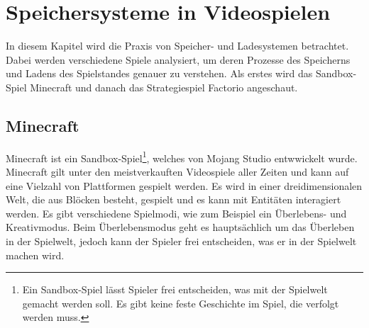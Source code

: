\chapter{Speichersysteme in Videospielen}\label{ch:videospiele}
In diesem Kapitel wird die Praxis von Speicher- und Ladesystemen betrachtet. Dabei werden verschiedene Spiele analysiert, um deren Prozesse des Speicherns und Ladens des Spielstandes genauer zu verstehen. Als erstes wird das Sandbox-Spiel Minecraft und danach das Strategiespiel Factorio angeschaut. 


\section{Minecraft}
Minecraft ist ein Sandbox-Spiel\footnote{Ein Sandbox-Spiel lässt Spieler frei entscheiden, was mit der Spielwelt gemacht werden soll. Es gibt keine feste Geschichte im Spiel, die verfolgt werden muss.\cite{ocio2009multi}}, welches von Mojang Studio entwwickelt wurde. Minecraft gilt unter den meistverkauften Videospiele aller Zeiten und kann auf eine Vielzahl von Plattformen gespielt werden.\cite{ignBestSellingVideo} Es wird in einer dreidimensionalen Welt, die aus Blöcken besteht, gespielt und es kann mit Entitäten interagiert werden. Es gibt verschiedene Spielmodi, wie zum Beispiel ein Überlebens- und Kreativmodus. Beim Überlebensmodus geht es hauptsächlich um das Überleben in der Spielwelt, jedoch kann der Spieler frei entscheiden, was er in der Spielwelt machen wird.\cite{minecraftWikiHome}

